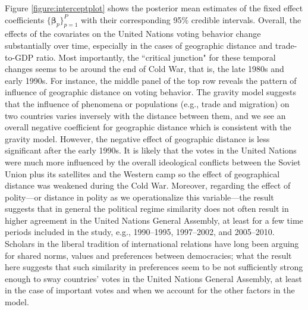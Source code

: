 \documentclass[a4paper]{article}
\begin{document}
\newline\noindent Figure \ref{figure:interceptplot} shows the posterior mean estimates of the fixed effect coefficients $\{\boldsymbol{\beta}_p\}_{p=1}^P$ with their corresponding 95\% credible intervals. Overall, the effects of the covariates on the United Nations voting behavior change substantially over time, especially in the cases of geographic distance and trade-to-GDP ratio. Most importantly, the ``critical junction" for these temporal changes seems to be around the end of Cold War, that is, the late 1980s and early 1990s. For instance, the middle panel of the top row reveals the pattern of influence of geographic distance on voting behavior. The gravity model \citep{leibenstein1966shaping,rodrigue2009geography} suggests that the influence of phenomena or populations (e.g., trade and migration) on two countries varies inversely with the distance between them, and we see an overall negative coefficient for geographic distance which is consistent with the gravity model. However, the negative effect of geographic distance is less significant after the early 1990s. It is likely that the votes in the United Nations were much more influenced by the overall ideological conflicts between the Soviet Union plus its satellites and the Western camp so the effect of geographical distance was weakened during the Cold War. Moreover, regarding the effect of polity---or distance in polity as we operationalize this variable---the result suggests that in general the political regime similarity does not often result in higher agreement in the United Nations General Assembly, at least for a few time periods included in the study, e.g., 1990--1995, 1997--2002, and 2005--2010. Scholars in the liberal tradition of international relations have long been arguing for shared norms, values and preferences between democracies; what the result here suggests that such similarity in preferences seem to be not sufficiently strong enough to sway countries' votes in the United Nations General Assembly, at least in the case of important votes and when we account for the other factors in the model.\\
\end{document}
